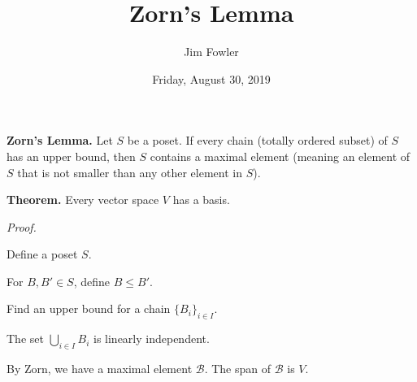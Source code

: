 \documentclass{homework}
\author{Jim Fowler}
\title{Zorn's Lemma}
\date{Friday, August 30, 2019}
\begin{document}
\maketitle

\textbf{Zorn's Lemma.} Let $S$ be a poset.  If every chain (totally
ordered subset) of $S$ has an upper bound, then $S$ contains a maximal
element (meaning an element of $S$ that is not smaller than any other
element in $S$).

\textbf{Theorem.} Every \phantom{nonzero} vector space $V$ has a basis.

\textit{Proof.}

\begin{problem}
  Define a poset $S$.
\end{problem}

\begin{problem}
  For $B, B' \in S$, define $B \leq B'$.
\end{problem}

\begin{problem}
  Find an upper bound for a chain $\{ B_i \}_{i \in I}$.
\end{problem}

\vfill

\begin{problem}
  The set $\bigcup_{i \in I} B_i$ is linearly independent.
\end{problem}

\vfill

\begin{problem}
  By Zorn, we have a maximal element $\mathcal{B}$.  The span of $\mathcal{B}$ is $V$.
\end{problem}

\vfill
\end{document}

